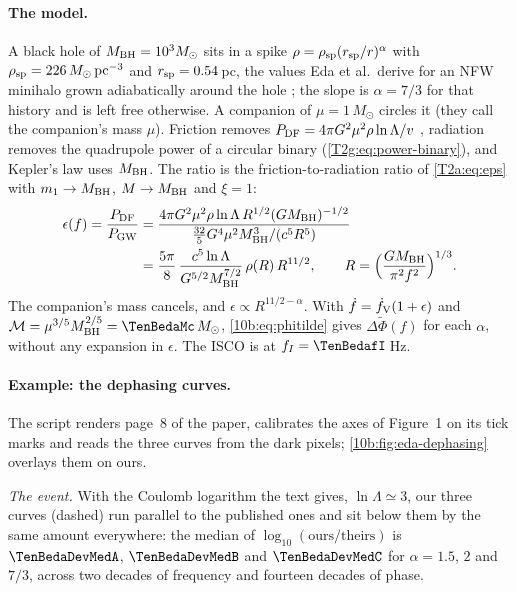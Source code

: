 \paragraph{The model.} A black hole of $M_{\rm BH}=10^3M_\odot$ sits in a spike $\rho=\rho_{\rm sp}(r_{\rm sp}/r)^\alpha$
with $\rho_{\rm sp}=226\,M_\odot\,{\rm pc}^{-3}$ and $r_{\rm sp}=0.54$\,pc, the values Eda et al.\ derive for an NFW
minihalo grown adiabatically around the hole \cite[Table~I]{Eda2015}; the slope is $\alpha=7/3$ for that history and is
left free otherwise. A companion of $\mu=1\,M_\odot$ circles it (they call the companion's mass $\mu$). Friction removes
$P_{\rm DF}=4\pi G^2\mu^2\rho\ln\Lambda/v$ \cite[eq.~(16)]{Eda2015}, radiation removes the quadrupole power of a circular binary (\cref{T2g:eq:power-binary}), and Kepler's
law uses $M_{\rm BH}$. The ratio is the friction-to-radiation ratio of \cref{T2a:eq:eps} with $m_1\to M_{\rm BH}$,
$M\to M_{\rm BH}$ and $\xi=1$:
\begin{align}
  \epsilon(f)=\frac{P_{\rm DF}}{P_{\rm GW}}
  &=\frac{4\pi G^2\mu^2\rho\ln\Lambda\,R^{1/2}(GM_{\rm BH})^{-1/2}}{\frac{32}{5}G^4\mu^2M_{\rm BH}^3/(c^5R^5)}\nonumber\\
  &=\frac{5\pi}{8}\,\frac{c^5\ln\Lambda}{G^{5/2}M_{\rm BH}^{7/2}}\,\rho(R)\,R^{11/2},
  \qquad R=\Big(\frac{GM_{\rm BH}}{\pi^2f^2}\Big)^{1/3}.
  \label{10b:eq:eps-eda}
\end{align}
The companion's mass cancels, and $\epsilon\propto R^{11/2-\alpha}$. With $\dot f=\dot f_{\rm V}(1+\epsilon)$ and
$\mathcal M=\mu^{3/5}M_{\rm BH}^{2/5}=\TenBedaMc\,M_\odot$, \eqref{10b:eq:phitilde} gives $\Delta\tilde\Phi(f)$ for each
$\alpha$, without any expansion in $\epsilon$. The ISCO is at $f_I=\TenBedafI$\,Hz.

\paragraph{Example: the dephasing curves.} The script renders page~8 of the paper, calibrates the axes of Figure~1 on
its tick marks and reads the three curves from the dark pixels; \cref{10b:fig:eda-dephasing} overlays them on ours.

\emph{The event.} With the Coulomb logarithm the text gives, $\ln\Lambda\simeq3$, our three curves (dashed) run
parallel to the published ones and sit below them by the same amount everywhere: the median of
$\log_{10}(\text{ours}/\text{theirs})$ is $\TenBedaDevMedA$, $\TenBedaDevMedB$ and $\TenBedaDevMedC$ for
$\alpha=1.5$, $2$ and $7/3$, across two decades of frequency and fourteen decades of phase.

